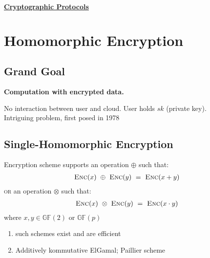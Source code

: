 \documentclass{report}
\begin{document}
\begin{center}
\huge{\textbf{\underline{Cryptographic Protocols}}}
\end{center}
 
{\let\clearpage\relax \chapter{Homomorphic Encryption}}

\section{Grand Goal}
\begin{adjustwidth}{2em}{2em}
	\textbf{Computation with encrypted data.}
	\begin{tikzpicture}
	\end{tikzpicture}
	No interaction between user and cloud. User holds $sk$ (private key). \\
	Intriguing problem, first posed in 1978
\end{adjustwidth}

\section{Single-Homomorphic Encryption}
\begin{adjustwidth}{2em}{2em}
	Encryption scheme supports an operation $\oplus$ such that:
	\begin{align*}
		\textsc{Enc}(x) \ \oplus \ \textsc{Enc}(y) \ = \ \textsc{Enc}(x + y)
	\end{align*}
	\textsc{or} an operation $\otimes$ such that:
	\begin{align*}
		\textsc{Enc}(x) \ \otimes \ \textsc{Enc}(y) \ = \ \textsc{Enc}(x \cdot y)
	\end{align*}
	where $x, y \in \mathbb{GF}(2)$ or $\mathbb{GF}(p)$
	\begin{enumerate}[$\rightarrow$]
		\item such schemes exist and are efficient
		\item Additively kommutative ElGamal; Paillier scheme
	\end{enumerate}
\end{adjustwidth}
\end{document}
